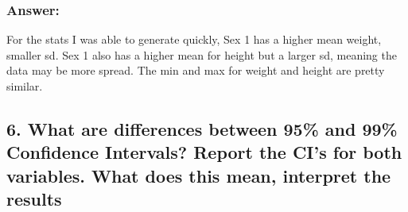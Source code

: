 \documentclass[]{article}
\begin{document}
\hypertarget{answer-4}{%
\subsubsection{Answer:}\label{answer-4}}

For the stats I was able to generate quickly, Sex 1 has a higher mean
weight, smaller sd. Sex 1 also has a higher mean for height but a larger
sd, meaning the data may be more spread. The min and max for weight and
height are pretty similar.

\hypertarget{what-are-differences-between-95-and-99-confidence-intervals-report-the-cis-for-both-variables.-what-does-this-mean-interpret-the-results}{%
\subsection{6. What are differences between 95\% and 99\% Confidence
Intervals? Report the CI's for both variables. What does this mean,
interpret the
results}\label{what-are-differences-between-95-and-99-confidence-intervals-report-the-cis-for-both-variables.-what-does-this-mean-interpret-the-results}}
\end{document}
